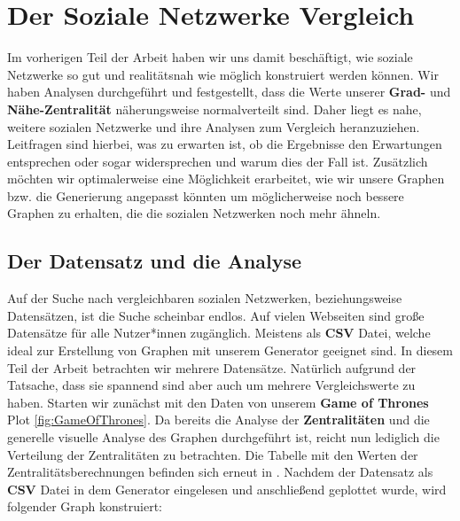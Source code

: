 \chapter{Der Soziale Netzwerke Vergleich}\label{ch:vergleich}

Im vorherigen Teil der Arbeit haben wir uns damit beschäftigt, wie soziale Netzwerke so gut und realitätsnah wie möglich konstruiert werden können. Wir haben Analysen durchgeführt und festgestellt, dass die Werte unserer \textbf{Grad-} und \textbf{Nähe-Zentralität} näherungsweise normalverteilt sind. Daher liegt es nahe, weitere sozialen Netzwerke und ihre Analysen zum Vergleich heranzuziehen. Leitfragen sind hierbei, was zu erwarten ist, ob die Ergebnisse den Erwartungen entsprechen oder sogar widersprechen und warum dies der Fall ist. Zusätzlich möchten wir optimalerweise eine Möglichkeit erarbeitet, wie wir unsere Graphen bzw. die Generierung angepasst könnten um möglicherweise noch bessere Graphen zu erhalten, die die sozialen Netzwerken noch mehr ähneln. 

\section{Der Datensatz und die Analyse}
Auf der Suche nach vergleichbaren sozialen Netzwerken, beziehungsweise Datensätzen, ist die Suche scheinbar endlos. Auf vielen Webseiten sind große Datensätze für alle Nutzer*innen zugänglich. Meistens als \textbf{CSV} Datei, welche ideal zur Erstellung von Graphen mit unserem Generator geeignet sind. In diesem Teil der Arbeit betrachten wir mehrere Datensätze. Natürlich aufgrund der Tatsache, dass sie spannend sind aber auch um mehrere Vergleichswerte zu haben. Starten wir zunächst mit den Daten \cite{GOT} von unserem \textbf{Game of Thrones} Plot \ref{fig:GameOfThrones}. Da bereits die Analyse der \textbf{Zentralitäten} und die generelle visuelle Analyse des Graphen durchgeführt ist, reicht nun lediglich die Verteilung der Zentralitäten zu betrachten. Die Tabelle mit den Werten der Zentralitätsberechnungen befinden sich erneut in \cite{TZ}. Nachdem der Datensatz als \textbf{CSV} Datei in dem Generator eingelesen und anschließend geplottet wurde, wird folgender Graph konstruiert:

